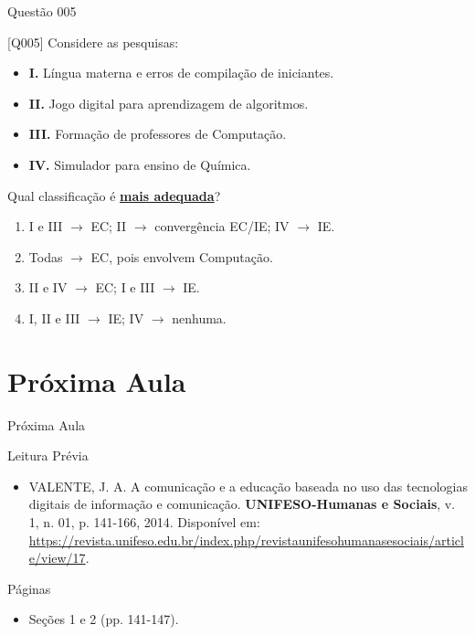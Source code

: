 \documentclass[xcolor=dvipsnames,table]{beamer}
\begin{document}
     \begin{frame}{Questão 005}

    \begin{block}{[Q005]}
        Considere as pesquisas:

        \begin{itemize}
            \item \textbf{I.} Língua materna e erros de compilação de iniciantes.
            \item \textbf{II.} Jogo digital para aprendizagem de algoritmos.
            \item \textbf{III.} Formação de professores de Computação.
            \item \textbf{IV.} Simulador para ensino de Química.
        \end{itemize}

        Qual classificação é \underline{\bf mais adequada}?
    \end{block}

    \begin{enumerate}[label=(\Alph*)]
        \item I e III $\rightarrow$ EC; II $\rightarrow$ convergência EC/IE;
              IV $\rightarrow$ IE.
        \item Todas $\rightarrow$ EC, pois envolvem Computação.
        \item II e IV $\rightarrow$ EC; I e III $\rightarrow$ IE.
        \item I, II e III $\rightarrow$ IE; IV $\rightarrow$ nenhuma.
    \end{enumerate}

\end{frame}

\section{Próxima Aula}
\begin{frame}{Próxima Aula }
    \begin{block}{Leitura Prévia}
        \begin{itemize}
            \item VALENTE, J. A. A comunicação e a educação baseada no uso das tecnologias digitais de informação e comunicação. {\bf UNIFESO-Humanas e Sociais}, v. 1, n. 01, p. 141-166, 2014. Disponível em: \url{https://revista.unifeso.edu.br/index.php/revistaunifesohumanasesociais/article/view/17}.  
        \end{itemize}
    \end{block}
    \begin{block}{Páginas}
        \begin{itemize}
        \item Seções 1 e 2 (pp. 141-147). 
        \end{itemize}
    \end{block}
\end{frame}
	
	\begin{frame}
		\titlepage
	\end{frame}
	
\end{document}
